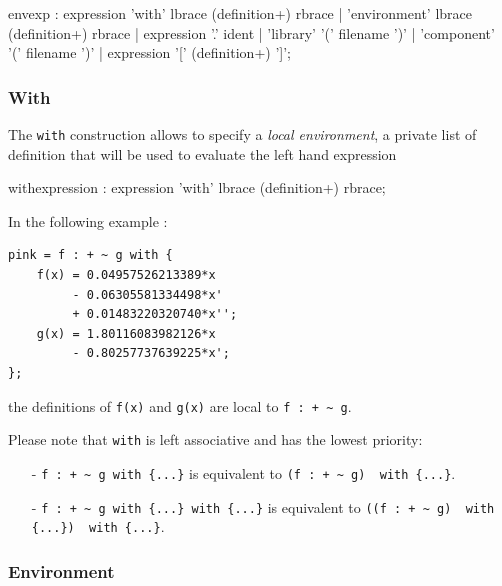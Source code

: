 \documentclass[a4paper,10pt]{book}
\begin{document}
\begin{rail}
envexp :    expression 'with' lbrace (definition+) rbrace
          | 'environment' lbrace (definition+) rbrace
		  | expression '.' ident
          | 'library' '(' filename ')'
          | 'component' '(' filename ')'
          | expression '[' (definition+) ']';         
\end{rail}

\subsubsection{With} 
The \lstinline'with' construction allows to specify a \textit{local environment}, a private list of definition that will be used to evaluate the left hand expression


\begin{rail}
withexpression : expression 'with' lbrace (definition+) rbrace;
\end{rail}


In the following example :
\begin{lstlisting}
pink = f : + ~ g with {
	f(x) = 0.04957526213389*x 
		 - 0.06305581334498*x' 
         + 0.01483220320740*x'';
	g(x) = 1.80116083982126*x 
		 - 0.80257737639225*x';
};
\end{lstlisting}
the definitions of \lstinline'f(x)' and \lstinline'g(x)' are local to \lstinline'f : + ~ g'.

Please note that \lstinline'with' is left associative and has the lowest priority:
\begin{itemize} 
\item[-] \lstinline'f : + ~ g with {...}' is equivalent to \lstinline'(f : + ~ g)  with {...}'. 
\item[-] \lstinline'f : + ~ g with {...} with {...}' is equivalent to \lstinline'((f : + ~ g)  with {...})  with {...}'. 
\end{itemize}

\subsubsection{Environment} 
\end{document}
